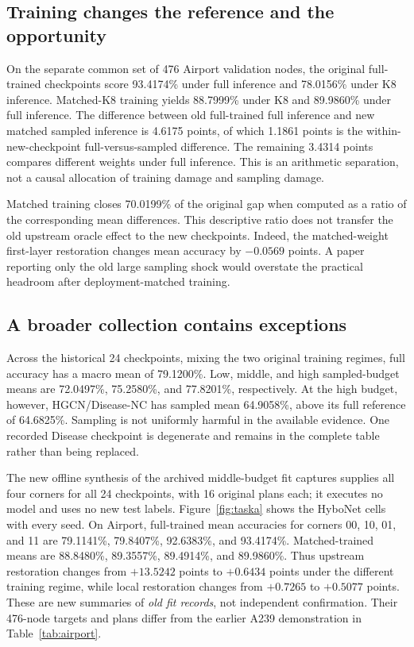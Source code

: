 \subsection{Training changes the reference and the opportunity}
On the separate common set of 476 Airport validation nodes, the original full-trained checkpoints score 93.4174\% under full inference and 78.0156\% under K8 inference. Matched-K8 training yields 88.7999\% under K8 and 89.9860\% under full inference. The difference between old full-trained full inference and new matched sampled inference is 4.6175 points, of which 1.1861 points is the within-new-checkpoint full-versus-sampled difference. The remaining 3.4314 points compares different weights under full inference. This is an arithmetic separation, not a causal allocation of training damage and sampling damage.

Matched training closes 70.0199\% of the original gap when computed as a ratio of the corresponding mean differences. This descriptive ratio does not transfer the old upstream oracle effect to the new checkpoints. Indeed, the matched-weight first-layer restoration changes mean accuracy by $-0.0569$ points. A paper reporting only the old large sampling shock would overstate the practical headroom after deployment-matched training.

\subsection{A broader collection contains exceptions}
Across the historical 24 checkpoints, mixing the two original training regimes, full accuracy has a macro mean of 79.1200\%. Low, middle, and high sampled-budget means are 72.0497\%, 75.2580\%, and 77.8201\%, respectively. At the high budget, however, HGCN/Disease-NC has sampled mean 64.9058\%, above its full reference of 64.6825\%. Sampling is not uniformly harmful in the available evidence. One recorded Disease checkpoint is degenerate and remains in the complete table rather than being replaced.

The new offline synthesis of the archived middle-budget fit captures supplies all four corners for all 24 checkpoints, with 16 original plans each; it executes no model and uses no new test labels. Figure~\ref{fig:taska} shows the HyboNet cells with every seed. On Airport, full-trained mean accuracies for corners 00, 10, 01, and 11 are 79.1141\%, 79.8407\%, 92.6383\%, and 93.4174\%. Matched-trained means are 88.8480\%, 89.3557\%, 89.4914\%, and 89.9860\%. Thus upstream restoration changes from $+13.5242$ points to $+0.6434$ points under the different training regime, while local restoration changes from $+0.7265$ to $+0.5077$ points. These are new summaries of \emph{old fit records}, not independent confirmation. Their 476-node targets and plans differ from the earlier A239 demonstration in Table~\ref{tab:airport}.

